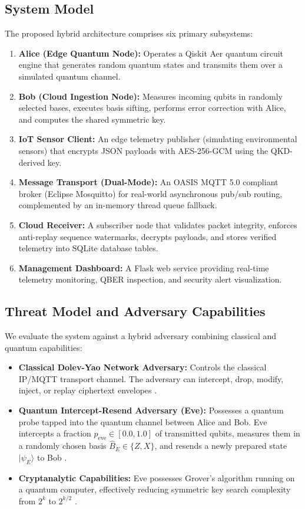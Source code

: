 \documentclass[journal,10pt,twocolumn]{article}
\begin{document}
\subsection{System Model}
The proposed hybrid architecture comprises six primary subsystems:
\begin{enumerate}
    \item \textbf{Alice (Edge Quantum Node):} Operates a Qiskit Aer quantum circuit engine that generates random quantum states and transmits them over a simulated quantum channel.
    \item \textbf{Bob (Cloud Ingestion Node):} Measures incoming qubits in randomly selected bases, executes basis sifting, performs error correction with Alice, and computes the shared symmetric key.
    \item \textbf{IoT Sensor Client:} An edge telemetry publisher (simulating environmental sensors) that encrypts JSON payloads with AES-256-GCM using the QKD-derived key.
    \item \textbf{Message Transport (Dual-Mode):} An OASIS MQTT 5.0 compliant broker (Eclipse Mosquitto) for real-world asynchronous pub/sub routing, complemented by an in-memory thread queue fallback.
    \item \textbf{Cloud Receiver:} A subscriber node that validates packet integrity, enforces anti-replay sequence watermarks, decrypts payloads, and stores verified telemetry into SQLite database tables.
    \item \textbf{Management Dashboard:} A Flask web service providing real-time telemetry monitoring, QBER inspection, and security alert visualization.
\end{enumerate}

\subsection{Threat Model and Adversary Capabilities}
We evaluate the system against a hybrid adversary combining classical and quantum capabilities:
\begin{itemize}
    \item \textbf{Classical Dolev-Yao Network Adversary:} Controls the classical IP/MQTT transport channel. The adversary can intercept, drop, modify, inject, or replay ciphertext envelopes \cite{sengupta2026securing}.
    \item \textbf{Quantum Intercept-Resend Adversary (Eve):} Possesses a quantum probe tapped into the quantum channel between Alice and Bob. Eve intercepts a fraction $p_{\text{eve}} \in [0.0, 1.0]$ of transmitted qubits, measures them in a randomly chosen basis $\hat{B}_E \in \{Z, X\}$, and resends a newly prepared state $|\psi_E\rangle$ to Bob \cite{fiorini2024estimating}.
    \item \textbf{Cryptanalytic Capabilities:} Eve possesses Grover's algorithm running on a quantum computer, effectively reducing symmetric key search complexity from $2^k$ to $2^{k/2}$ \cite{tupkary2026security}.
\end{itemize}
\end{document}
